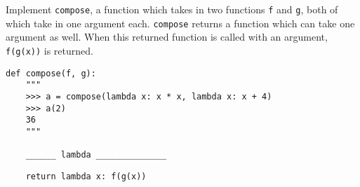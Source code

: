 \begin{blocksection}
\question Implement \lstinline$compose$, a function which takes in two functions \lstinline$f$ and \lstinline$g$, both of which take in one argument each. \lstinline$compose$ returns a function which can take one argument as well. When this returned function is called with an argument, \lstinline$f(g(x))$ is returned.

\begin{lstlisting}
def compose(f, g):
    """
    >>> a = compose(lambda x: x * x, lambda x: x + 4)
    >>> a(2)
    36
    """

    ______ lambda ______________

\end{lstlisting}

\begin{solution}[0.25in]
\begin{lstlisting}
    return lambda x: f(g(x))
\end{lstlisting}
\end{solution}
\end{blocksection}
